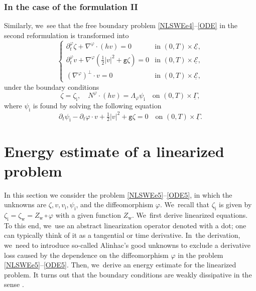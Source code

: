 \documentclass[11pt]{article}
\newcommand{\gr}{{\mathtt g}}
\newcommand{\dt}{\partial_t}
\newcommand{\cE}{{\mathcal E}}
\newcommand{\ul}[1]{\underline{#1}}
\newcommand{\itGamma}{\mathit{\Gamma}}
\theoremstyle{definition}
\begin{document}
\subsubsection{In the case of the formulation II}
Similarly, we~see that the free boundary problem \eqref{NLSWEe4}--\eqref{ODE} in the second reformulation is transformed into
\begin{equation}\label{NLSWEe5}
\begin{cases}
\dt^\varphi\zeta+\nabla^\varphi\cdot(hv) = 0 &\text{in } (0,T)\times\ul{\cE}, \\
\dt^\varphi v+\nabla^\varphi(\frac12|v|^2+\gr\zeta) = 0 &\text{in } (0,T)\times\ul{\cE}, \\
(\nabla^\varphi)^\perp\cdot v = 0 &\text{in } (0,T)\times\ul{\cE},
\end{cases}
\end{equation}
under the boundary conditions
\begin{equation}\label{BC5}
\zeta=\zeta_\mathrm{i}, \quad N^\varphi\cdot (h v) = \Lambda_\varphi \psi_\mathrm{i} \quad\text{on } (0,T)\times\ul{\itGamma},
\end{equation}
where $\psi_\mathrm{i}$ is found by solving the following equation
\begin{equation}\label{ODE5}
\dt \psi_\mathrm{i} -\dt \varphi\cdot v + \tfrac12|v|^2+\gr\zeta = 0 \quad\text{on } (0,T)\times\ul{\itGamma}.
\end{equation}

\section{Energy estimate of a linearized problem}\label{sect:EE}
In this section we consider the problem \eqref{NLSWEe5}--\eqref{ODE5}, in which the unknowns are $\zeta,v,v_\mathrm{i}, \psi_\mathrm{i}$, and the diffeomorphism $\varphi$. We~recall that $\zeta_\mathrm{i}$ is given by $\zeta_\mathrm{i}=\zeta_\mathrm{w}=Z_\mathrm{w}\circ\varphi$ with a given function $Z_\mathrm{w}$. We~first derive linearized equations.
To this end, we~use an abstract linearization operator denoted with a dot; one can typically think of it as a tangential or time derivative. In~the derivation, we~need to introduce so-called Alinhac's good unknowns to exclude a derivative loss caused by the dependence on the diffeomorphism $\varphi$
in the problem \eqref{NLSWEe5}--\eqref{ODE5}.
Then, we~derive an energy estimate for the linearized problem.
It turns out that the boundary conditions are weakly dissipative in the sense \cite{IguchiLannes2023}.
\end{document}
